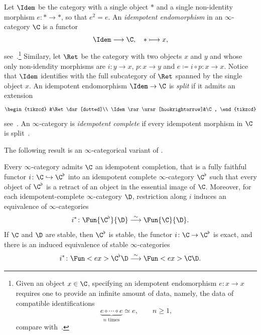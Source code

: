 \documentclass[a4paper]{amsart}
\begin{document}
\begin{definition}
  \label{def:Idem}
  Let $\Idem$ be the category with a single object $*$ and a single non-identity
  morphism $e\colon *\to *$, so that $e^2=e$. An \emph{idempotent endomorphism}
  in an $\infty$-category $\C$ is a functor
  \[
    \Idem\longrightarrow\C,\quad *\longmapsto x,
  \]
  see~\cite[\href{https://kerodon.net/tag/03ZT}{Definition
    03ZT}]{kerodon}.\footnote{Given an object $x\in\C$, specifying an idempotent
    endomorphism $e\colon x\to x$ requires one to provide an infinite amount of
    data, namely, the data of compatible identifications
    \[
      \underbrace{e\circ\cdots\circ e}_{n\text{ times}}\simeq e,\qquad n\geq1,
    \]
    compare with~\cite[Section~4]{GHW21}.} Similary, let $\Ret$ be the category
  with two objects $x$ and $y$ and whose only non-idendity morphisms are
  $i\colon y\to x$, $p\colon x\to y$ and $e\coloneq i\circ p\colon x\to x$.
  Notice that $\Idem$ identifies with the full subcategory of $\Ret$ spanned by
  the single object $x$. An idempotent endomorphism $\Idem\to\C$ is \emph{split}
  if it admits an extension
  \[
    \begin{tikzcd}
      &\Ret\dar[dotted]\\
      \Idem\rar\urar[hookrightarrow]&\C,
    \end{tikzcd}
  \]
  see~\cite[\href{https://kerodon.net/tag/03ZX}{Definition 03ZX}]{kerodon}. An
  $\infty$-category is \emph{idempotent complete} if every idempotent morphism
  in $\C$ is
  split~\cite[\href{https://kerodon.net/tag/0406}{Definition~0406}]{kerodon}.
\end{definition}

The following result is an $\infty$-categorical variant of
\cite[Theorem~1.5]{BS01}.

\begin{proposition}
  Every $\infty$-category admits $\C$ an idempotent completion, that is a fully
  faithful functor $i\colon\C\hookrightarrow\C^\flat$ into an idempotent
  complete $\infty$-category $\C^\flat$ such that every object of $\C^\flat$ is
  a retract of an object in the essential image of $\C$. Moreover, for each
  idempotent-complete $\infty$-category $\D$, restriction along $i$ induces an
  equivalence of $\infty$-categories
  \[
    i^*\colon\Fun{\C^\flat}{\D}\stackrel{\sim}{\longrightarrow}\Fun{\C}{\D}.
  \]
  If $\C$ and $\D$ are stable, then $\C^\flat$ is stable, the functor
  $i\colon\C\to\C^\flat$ is exact, and there is an induced equivalence of stable
  $\infty$-categories
  \[
    i^*\colon\Fun<ex>{\C^\flat}{\D}\stackrel{\sim}{\longrightarrow}\Fun<ex>{\C}{\D}.
  \]
\end{proposition}
\end{document}
